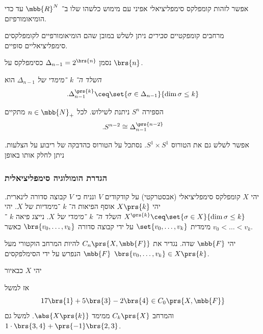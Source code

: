 \documentclass[a4paper,10pt,twoside,openany]{book}
\begin{document}
\begin{corollary}
אפשר לזהות קומפלקס סימפליציאלי אפיני עם מימוש כלשהו שלו ב־%
$\mbb{R}^N$
עד כדי הומיאומורפיזם.
\end{corollary}

מרחבים קומפקטיים
\textit{סבירים}
ניתן לשלש במובן שהם הומיאומורפיים לקומפלקסים סימפליציאליים סופיים.

\begin{notation}
נסמן
$\Delta_{n-1} = 2^{\brs{n}}$
כסימפלקס על
$\brs{n}$.
\end{notation}

\begin{notation}
\emph{השלד ה־%
$k$%
־מימדי של
$\Delta_{n-1}$}
הוא
\[\text{.} \Delta_{n-1}^{\prs{k}} \ceq \set{\sigma \in \Delta_{n-1}}{\dim \sigma \leq k}\]
\end{notation}

\begin{example}
הספירה
$S^n$
ניתנת לשילוש.
לכל
$n \in \mbb{N}_+$
מתקיים
\[\text{.} S^{n-2} \cong \Delta_{n-1}^{\prs{n-2}}\]
\end{example}

\begin{example}
אפשר לשלש גם את הטורוס
$S^1 \times S^1$.
נסתכל על הטורוס כהדבקה של ריבוע על הצלעות. ניתן לחלק אותו באופן
\end{example}

\subsubsection{הגדרת הומולוגיה סימפליציאלית}

יהי
$X$
קומפלקס סימפליציאלי (אבסטרקטי) על קודקודים
$V$
ונניח כי
$V$
קבוצה סדורה לינארית.
יהי
$X\prs{k}$
אוסף הפיאות ה־%
$k$%
־מימדיות של
$X$.
יהי
$X^{\prs{k}} \ceq \set{\sigma \in X}{\dim \sigma \leq k}$
\emph{השלד ה־%
$k$%
־מימדי של
$X$}.
נייצג פיאה
$k$%
־מימדית
$\set{v_0, \ldots, v_k}$
על ידי קבוצה סדורה
$\brs{v_0, \ldots, v_k}$
כאשר
$v_0 < \ldots < v_k$.

\begin{definition}
יהי
$\mbb{F}$
שדה. נגדיר את
$C_n\prs{X,\mbb{F}}$
להיות המרחב הוקטורי מעל
$\mbb{F}$
הנפרש על ידי הסימלפקסים
$\brs{v_0, \ldots, v_k} \in X\prs{k}$.
\end{definition}

\begin{example}
יהי
$X$
כבאיור

אז למשל
\[17 \brs{1} + 5 \brs{3} - 2 \brs{4} \in C_0\prs{X,\mbb{F}}\]
והמרחב
$C_k\prs{X}$
ממימד
$\abs{X\prs{k}}$.
למשל גם
$1 \cdot \brs{3,4} + \prs{-1}\brs{2,3}$.
\end{example}
\end{document}
